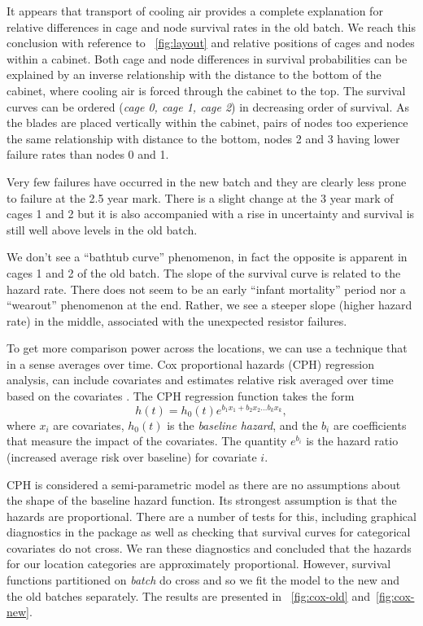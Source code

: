 It appears that transport of cooling air provides a complete
explanation for relative differences in cage and node survival rates
in the old batch.  We reach this conclusion with reference to
~\ref{fig:layout} and relative positions of cages and nodes
within a cabinet. Both cage and node differences in survival
probabilities can be explained by an inverse relationship with the
distance to the bottom of the cabinet, where cooling air is forced
through the cabinet to the top. The survival curves can be ordered
({\em cage 0, cage 1, cage 2}) in decreasing order of survival. As the
blades are placed vertically within the cabinet, pairs of nodes too
experience the same relationship with distance to the bottom, nodes 2
and 3 having lower failure rates than nodes 0 and 1.

Very few failures have occurred in the new batch and they are clearly
less prone to failure at the 2.5 year mark. There is a slight change
at the 3 year mark of cages 1 and 2 but it is also accompanied with a
rise in uncertainty and survival is still well above levels in the old
batch.

We don't see a ``bathtub curve'' phenomenon, in fact the opposite is
apparent in cages 1 and 2 of the old batch. The slope of the survival
curve is related to the hazard rate. There does not seem to be an
early ``infant mortality'' period nor a ``wearout'' phenomenon at the
end. Rather, we see a steeper slope (higher hazard rate) in the
middle, associated with the unexpected resistor failures.

To get more comparison power across the locations, we can use a
technique that in a sense averages over time. Cox proportional hazards
(CPH) regression analysis, can include covariates and estimates relative
risk averaged over time based on the covariates
\cite{Cox1972,Harrell2015}. The CPH regression function takes the form
\begin{displaymath}
  h(t) = h_0(t)e^{b_1 x_1 + b_2 x_2 \ldots b_k x_k},
\end{displaymath}
where $x_i$ are covariates, $h_0(t)$ is the {\em baseline hazard}, and
the $b_i$ are coefficients that measure the impact of the
covariates. The quantity $e^{b_i}$ is the hazard ratio (increased
average risk over baseline) for covariate $i$.

CPH is considered a semi-parametric model as there are no assumptions
about the shape of the baseline hazard function. Its strongest
assumption is that the hazards are proportional. There are a number of
tests for this, including graphical diagnostics in the 
package as well as checking that survival curves for categorical
covariates do not cross. We ran these diagnostics and concluded that
the hazards for our location categories are approximately
proportional. However, survival functions partitioned on {\em batch}
do cross and so we fit the model to the new and the old batches
separately. The results are presented in ~\ref{fig:cox-old}
and~\ref{fig:cox-new}.


